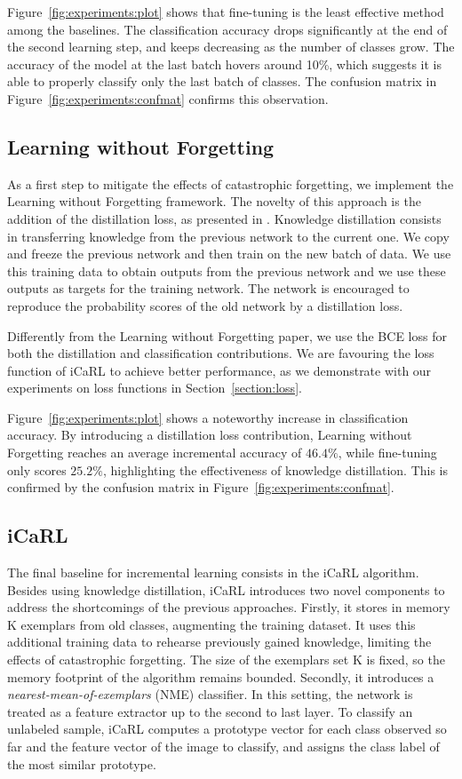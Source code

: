 \documentclass[10pt,twocolumn,letterpaper]{article}
\begin{document}
Figure~\ref{fig:experiments:plot} shows that fine-tuning is the least effective method among the baselines. The classification accuracy drops significantly at the end of the second learning step, and keeps decreasing as the number of classes grow. The accuracy of the model at the last batch hovers around 10\%, which suggests it is able to properly classify only the last batch of classes. The confusion matrix in Figure~\ref{fig:experiments:confmat} confirms this observation.

\subsection{Learning without Forgetting}
As a first step to mitigate the effects of catastrophic forgetting, we implement the Learning without Forgetting \cite{li:2016} framework. The novelty of this approach is the addition of the distillation loss, as presented in \cite{hinton:2015}. Knowledge distillation consists in transferring knowledge from the previous network to the current one. We copy and freeze the previous network and then train on the new batch of data. We use this training data to obtain outputs from the previous network and we use these outputs as targets for the training network. The network is encouraged to reproduce the probability scores of the old network by a distillation loss.

Differently from the Learning without Forgetting paper, we use the BCE loss for both the distillation and classification contributions. We are favouring the loss function of iCaRL to achieve better performance, as we demonstrate with our experiments on loss functions in Section~\ref{section:loss}.

Figure~\ref{fig:experiments:plot} shows a noteworthy increase in classification accuracy. By introducing a distillation loss contribution, Learning without Forgetting reaches an average incremental accuracy of $46.4\%$, while fine-tuning only scores $25.2\%$, highlighting the effectiveness of knowledge distillation. This is confirmed by the confusion matrix in Figure~\ref{fig:experiments:confmat}.

\subsection{iCaRL}
The final baseline for incremental learning consists in the iCaRL \cite{rebuffi:2017} algorithm. Besides using knowledge distillation, iCaRL introduces two novel components to address the shortcomings of the previous approaches. Firstly, it stores in memory K exemplars from old classes, augmenting the training dataset. It uses this additional training data to rehearse previously gained knowledge, limiting the effects of catastrophic forgetting. The size of the exemplars set K is fixed, so the memory footprint of the algorithm remains bounded. Secondly, it introduces a \emph{nearest-mean-of-exemplars} (NME) classifier. In this setting, the network is treated as a feature extractor up to the second to last layer. To classify an unlabeled sample, iCaRL computes a prototype vector for each class observed so far and the feature vector of the image to classify, and assigns the class label of the most similar prototype.
\end{document}
